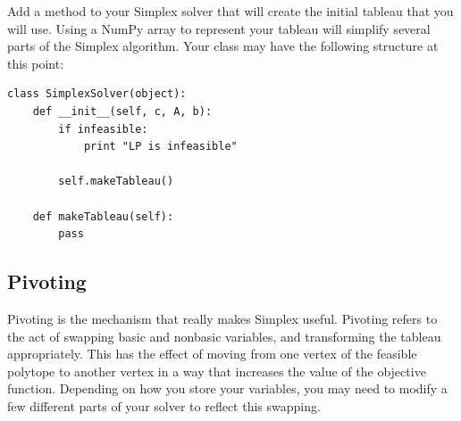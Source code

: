 \begin{problem}
Add a method to your Simplex solver that will create the initial tableau that you will use.
Using a NumPy array to represent your tableau will simplify several parts of the Simplex algorithm.
Your class may have the following structure at this point:
\begin{lstlisting}
class SimplexSolver(object):
    def __init__(self, c, A, b):
        if infeasible:
            print "LP is infeasible"

        self.makeTableau()

    def makeTableau(self):
        pass
\end{lstlisting}
\label{prob:maketableau}
\end{problem}

\subsection{Pivoting}
Pivoting is the mechanism that really makes Simplex useful.
Pivoting refers to the act of swapping basic and nonbasic variables, and transforming the tableau appropriately.
This has the effect of moving from one vertex of the feasible polytope to another vertex in a way that increases
the value of the objective function.
Depending on how you store your variables, you may need to modify a few different parts of your solver to reflect this swapping.

